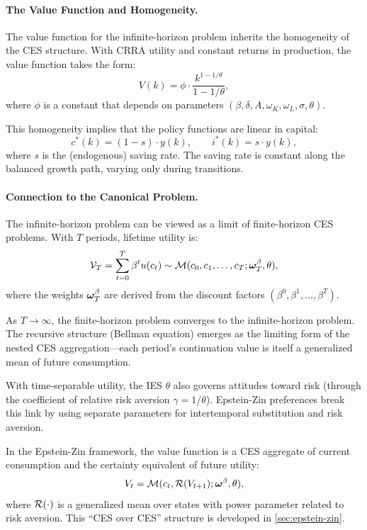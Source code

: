\paragraph{The Value Function and Homogeneity.}
The value function for the infinite-horizon problem inherits the homogeneity of the CES structure. With CRRA utility and constant returns in production, the value function takes the form:
\begin{equation}
V(k) = \phi \cdot \frac{k^{1-1/\theta}}{1 - 1/\theta},
\label{eq:value-function-form}
\end{equation}
where $\phi$ is a constant that depends on parameters $(\beta, \delta, A, \omega_K, \omega_L, \sigma, \theta)$.

This homogeneity implies that the policy functions are linear in capital:
\begin{equation}
c^*(k) = (1 - s) \cdot y(k), \qquad i^*(k) = s \cdot y(k),
\label{eq:policy-linear}
\end{equation}
where $s$ is the (endogenous) saving rate. The saving rate is constant along the balanced growth path, varying only during transitions.

\paragraph{Connection to the Canonical Problem.}
The infinite-horizon problem can be viewed as a limit of finite-horizon CES problems. With $T$ periods, lifetime utility is:
\begin{equation}
\mathcal{V}_T = \sum_{t=0}^{T} \beta^t u(c_t) \sim \mathcal{M}(c_0, c_1, \ldots, c_T; \boldsymbol{\omega}^\beta_T, \theta),
\label{eq:finite-horizon}
\end{equation}
where the weights $\boldsymbol{\omega}^\beta_T$ are derived from the discount factors $(\beta^0, \beta^1, \ldots, \beta^T)$.

As $T \to \infty$, the finite-horizon problem converges to the infinite-horizon problem. The recursive structure (Bellman equation) emerges as the limiting form of the nested CES aggregation---each period's continuation value is itself a generalized mean of future consumption.

\begin{calloutnote}
With time-separable utility, the IES $\theta$ also governs attitudes toward risk (through the coefficient of relative risk aversion $\gamma = 1/\theta$). Epstein-Zin preferences break this link by using separate parameters for intertemporal substitution and risk aversion.

In the Epstein-Zin framework, the value function is a CES aggregate of current consumption and the certainty equivalent of future utility:
\[
V_t = \mathcal{M}(c_t, \mathcal{R}(V_{t+1}); \boldsymbol{\omega}^\beta, \theta),
\]
where $\mathcal{R}(\cdot)$ is a generalized mean over states with power parameter related to risk aversion. This ``CES over CES'' structure is developed in \cref{sec:epstein-zin}.
\end{calloutnote}

